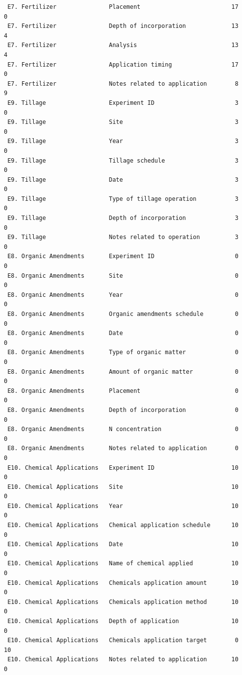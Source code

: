 \documentclass[
]{article}
\begin{document}
\begin{verbatim}
 E7. Fertilizer               Placement                          17       0
 E7. Fertilizer               Depth of incorporation             13       4
 E7. Fertilizer               Analysis                           13       4
 E7. Fertilizer               Application timing                 17       0
 E7. Fertilizer               Notes related to application        8       9
 E9. Tillage                  Experiment ID                       3       0
 E9. Tillage                  Site                                3       0
 E9. Tillage                  Year                                3       0
 E9. Tillage                  Tillage schedule                    3       0
 E9. Tillage                  Date                                3       0
 E9. Tillage                  Type of tillage operation           3       0
 E9. Tillage                  Depth of incorporation              3       0
 E9. Tillage                  Notes related to operation          3       0
 E8. Organic Amendments       Experiment ID                       0       0
 E8. Organic Amendments       Site                                0       0
 E8. Organic Amendments       Year                                0       0
 E8. Organic Amendments       Organic amendments schedule         0       0
 E8. Organic Amendments       Date                                0       0
 E8. Organic Amendments       Type of organic matter              0       0
 E8. Organic Amendments       Amount of organic matter            0       0
 E8. Organic Amendments       Placement                           0       0
 E8. Organic Amendments       Depth of incorporation              0       0
 E8. Organic Amendments       N concentration                     0       0
 E8. Organic Amendments       Notes related to application        0       0
 E10. Chemical Applications   Experiment ID                      10       0
 E10. Chemical Applications   Site                               10       0
 E10. Chemical Applications   Year                               10       0
 E10. Chemical Applications   Chemical application schedule      10       0
 E10. Chemical Applications   Date                               10       0
 E10. Chemical Applications   Name of chemical applied           10       0
 E10. Chemical Applications   Chemicals application amount       10       0
 E10. Chemical Applications   Chemicals application method       10       0
 E10. Chemical Applications   Depth of application               10       0
 E10. Chemical Applications   Chemicals application target        0      10
 E10. Chemical Applications   Notes related to application       10       0

\end{verbatim}
\end{document}
